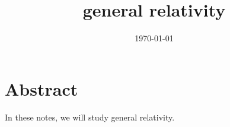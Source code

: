 \documentclass[a4paper, 12pt]{memoir}
\title{general relativity}
\date{\today}
\begin{document}
\frontmatter



\tableofcontents

\mainmatter



\chapter*{Abstract}

    In these notes, we will study general relativity.
    




 
\backmatter

\nocite{casadio}
\nocite{blau}
\nocite{schutz}
\nocite{carroll}
\nocite{python}

\clearpage
{}
\printbibliography
\end{document}
